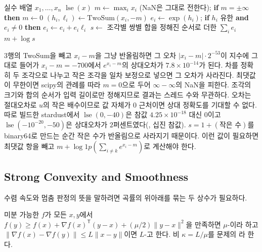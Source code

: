 \begin{algorithm}[htbp]
\begin{algorithmic}[1]
\Require 실수 배열 $x_1,\dots,x_n$
\Ensure $\operatorname{lse}(x)$
\State $m\gets\max_ix_i$ (NaN은 그대로 전한다); \textbf{if} $m=\pm\infty$ \textbf{then} $m\gets0$
  \State $(h_i,\ell_i)\gets\mathrm{TwoSum}(x_i,-m)$ 
  \State $e_i\gets\exp(h_i)$; \textbf{if} $h_i$ 유한 \textbf{and} $e_i\ne0$ \textbf{then} $e_i\gets e_i+e_i\ell_i$ 
\EndFor
\State $s\gets$ 조각별 쌍별 합을 정해진 순서로 더한 $\sum_ie_i$
\State \Return $m+\log s$
\end{algorithmic}
\caption{최댓값을 옮긴 log-sum-exp (stardust )}
\label{alg:lse}
\end{algorithm}

3행의 TwoSum을 빼고 $x_i-m$을 그냥 반올림하면 그 오차 $|x_i-m|\cdot2^{-53}$이 지수에 그대로 들어가 $x_i-m=-700$에서 $e^{x_i-m}$의 상대오차가 $7.8\times10^{-14}$가 된다. 차를 정확히 두 조각으로 나누고 작은 조각을 일차 보정으로 넣으면 그 오차가 사라진다. 최댓값이 무한이면 scipy의 관례를 따라 $m=0$으로 두어 $\infty-\infty$의 NaN을 피한다. 조각의 크기와 합의 순서가 입력 길이로만 정해지므로 결과는 스레드 수와 무관하다. 오차는 절대오차로 $u$의 작은 배수이므로 값 자체가 $0$ 근처이면 상대 정확도를 기대할 수 없다. 따로 빌드한 stardust에서 $\operatorname{lse}(0,-40)$은 참값 $4.25\times10^{-18}$ 대신 $0$이고 $\operatorname{lse}(-10^{-20},-50)$은 상대오차가 $2$퍼센트였다(, 십진 참값). $s=1+(\text{작은 수})$를 binary64로 만드는 순간 작은 수가 반올림으로 사라지기 때문이다. 이런 값이 필요하면 최댓값 항을 빼고 $m+\log1p(\sum_{i\ne k}e^{x_i-m})$로 계산해야 한다.

\subsection{Strong Convexity and Smoothness}
\label{sec:strong-convexity}

수렴 속도와 멈춤 판정의 뜻을 말하려면 곡률의 위아래를 묶는 두 상수가 필요하다.

\begin{definition}
\label{def:strong-smooth}
미분 가능한 $f$가 모든 $x,y$에서 $f(y)\ge f(x)+\nabla f(x)^{\mathsf T}(y-x)+(\mu/2)\|y-x\|^2$을 만족하면 $\mu$-이라 하고 $\|\nabla f(x)-\nabla f(y)\|\le L\|x-y\|$이면 $L$-고 한다. 비 $\kappa=L/\mu$를 문제의 라 한다.
\end{definition}

